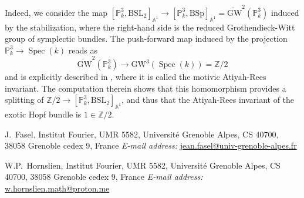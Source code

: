 \documentclass[11pt,leqno]{article}
\makeatletter
\newcommand{\Spec}{\operatorname{Spec}}
\newcommand{\Z}{{\mathbb Z}}
\newcommand{\A}{{\mathbb A}}
\renewcommand{\1}{{\rm 1\hspace*{-0.4ex}%
\rule{0.1ex}{1.52ex}\hspace*{0.2ex}}}
\newcommand{\<}[1]{{\langle}#1 {\rangle}}
\newcommand{\Addresses}{{%
 \bigskip
 \footnotesize

 J.~Fasel, Institut Fourier, UMR 5582, Université Grenoble Alpes, CS 40700, 38058 Grenoble cedex 9, France \textit{E-mail address:} \url{jean.fasel@univ-grenoble-alpes.fr}

 \medskip

 W.P.~Hornslien, Institut Fourier, UMR 5582, Université Grenoble Alpes, CS 40700, 38058 Grenoble cedex 9, France \textit{E-mail address:} \url{w.hornslien.math@proton.me}
}}
\theoremstyle{plain}
\theoremstyle{definition}
\theoremstyle{remark}
\numberwithin{equation}{section}
\makeatother
\begin{document}
Indeed, we consider the map $[\mathbb{P}^3_k,\mathrm{BSL}_2]_{\A^1}\to [\mathbb{P}^3_k,\mathrm{BSp}]_{\A^1}=\widetilde{\mathrm{GW}}^2(\mathbb{P}_k^3)$ induced by the stabilization, where the right-hand side is the reduced Grothendieck-Witt group of symplectic bundles. The push-forward map induced by the projection $\mathbb{P}^3_k\to \Spec(k)$ reads as
\[
\widetilde{\mathrm{GW}}^2(\mathbb{P}_k^3)\to \mathrm{GW}^3(\Spec(k))=\Z/2
\]
and is explicitly described in \cite[\S 4.2.2]{Asok25a}, where it is called the motivic Atiyah-Rees invariant. The computation therein shows that this homomorphism provides a splitting of $\Z/2\to [\mathbb{P}^3_k,\mathrm{BSL}_2]_{\A^1}$, and thus that the Atiyah-Rees invariant of the exotic Hopf bundle is $1\in \Z/2$.



\begin{footnotesize}

\end{footnotesize}
\Addresses
\end{document}
